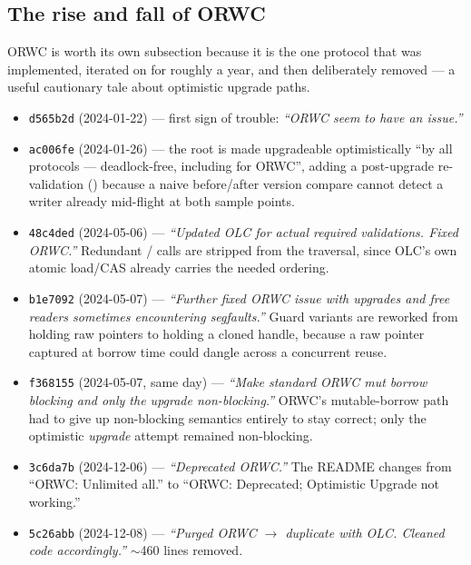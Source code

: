 \documentclass[11pt]{article}
\newcommand{\commit}[1]{\texttt{#1}}
\begin{document}
\subsection{The rise and fall of ORWC}

ORWC is worth its own subsection because it is the one protocol that was implemented,
iterated on for roughly a year, and then deliberately removed --- a useful cautionary
tale about optimistic upgrade paths.

\begin{itemize}
  \item \commit{d565b2d} (2024-01-22) --- first sign of trouble: \emph{``ORWC seem to
        have an issue.''}
  \item \commit{ac006fe} (2024-01-26) --- the root is made upgradeable optimistically
        ``by all protocols --- deadlock-free, including for ORWC'', adding a
        post-upgrade re-validation ()
        because a naive before/after version compare cannot detect a writer already
        mid-flight at both sample points.
  \item \commit{48c4ded} (2024-05-06) --- \emph{``Updated OLC for actual required
        validations. Fixed ORWC.''} Redundant /
        calls are stripped from the traversal, since OLC's own atomic load/CAS already
        carries the needed ordering.
  \item \commit{b1e7092} (2024-05-07) --- \emph{``Further fixed ORWC issue with upgrades
        and free readers sometimes encountering segfaults.''} Guard variants are reworked
        from holding raw pointers to holding a cloned  handle, because a
        raw pointer captured at borrow time could dangle across a concurrent reuse.
  \item \commit{f368155} (2024-05-07, same day) --- \emph{``Make standard ORWC mut
        borrow blocking and only the upgrade non-blocking.''} ORWC's mutable-borrow path
        had to give up non-blocking semantics entirely to stay correct; only the
        optimistic \emph{upgrade} attempt remained non-blocking.
  \item \commit{3c6da7b} (2024-12-06) --- \emph{``Deprecated ORWC.''} The README changes
        from ``ORWC: Unlimited all.'' to ``ORWC: Deprecated; Optimistic Upgrade not
        working.''
  \item \commit{5c26abb} (2024-12-08) --- \emph{``Purged ORWC $\to$ duplicate with OLC.
        Cleaned code accordingly.''} $\sim$460 lines removed.
\end{itemize}
\end{document}
